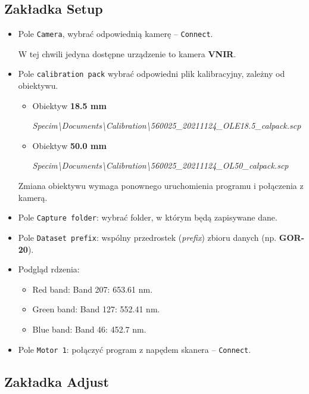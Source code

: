 \documentclass[
  letterpaper,
  DIV=11,
  numbers=noendperiod]{scrreprt}
\begin{document}
\hypertarget{zakux142adka-setup}{%
\subsection{Zakładka Setup}\label{zakux142adka-setup}}

\begin{itemize}
\item
  Pole \texttt{Camera}, wybrać odpowiednią kamerę -- \texttt{Connect}.

  W tej chwili jedyna dostępne urządzenie to kamera \textbf{VNIR}.
\item
  Pole \texttt{calibration\ pack} wybrać odpowiedni plik kalibracyjny,
  zależny od obiektywu.

  \begin{itemize}
  \item
    Obiektyw \textbf{18.5 mm}

    \emph{Specim\textbackslash Documents\textbackslash Calibration\textbackslash560025\_20211124\_OLE18.5\_calpack.scp}
  \item
    Obiektyw \textbf{50.0 mm}

    \emph{Specim\textbackslash Documents\textbackslash Calibration\textbackslash560025\_20211124\_OL50\_calpack.scp}
  \end{itemize}

  Zmiana obiektywu wymaga ponownego uruchomienia programu i połączenia z
  kamerą.
\item
  Pole \texttt{Capture\ folder}: wybrać folder, w którym będą zapisywane
  dane.
\item
  Pole \texttt{Dataset\ prefix}: wspólny przedrostek (\emph{prefix})
  zbioru danych (np. \textbf{GOR-20}).
\item
  Podgląd rdzenia:

  \begin{itemize}
  \item
    Red band: Band 207: 653.61 nm.
  \item
    Green band: Band 127: 552.41 nm.
  \item
    Blue band: Band 46: 452.7 nm.
  \end{itemize}
\item
  Pole \texttt{Motor\ 1}: połączyć program z napędem skanera --
  \texttt{Connect}.
\end{itemize}

\hypertarget{zakux142adka-adjust}{%
\subsection{Zakładka Adjust}\label{zakux142adka-adjust}}
\end{document}

